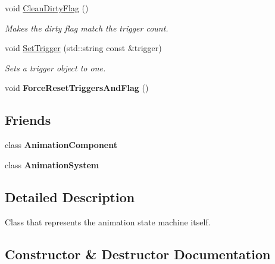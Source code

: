 \begin{DoxyCompactItemize}
\mbox{\label{classAnimatorController_a873290f0299ceeb9356cc87ff14d5a63}} 
void \hyperlink{classAnimatorController_a873290f0299ceeb9356cc87ff14d5a63}{Clean\+Dirty\+Flag} ()
\begin{DoxyCompactList}\small\item\em Makes the dirty flag match the trigger count. \end{DoxyCompactList}\item 
void \hyperlink{classAnimatorController_ac98dc31939a3e9b4377f01a0461b158d}{Set\+Trigger} (std\+::string const \&trigger)
\begin{DoxyCompactList}\small\item\em Sets a trigger object to one. \end{DoxyCompactList}\item 
\mbox{\label{classAnimatorController_a51a8be9bb0e31ea4d63742ff972a6512}} 
void {\bfseries Force\+Reset\+Triggers\+And\+Flag} ()
\end{DoxyCompactItemize}
\subsection*{Friends}
\begin{DoxyCompactItemize}
\item 
\mbox{\label{classAnimatorController_a47f9e2ec6ae5b27770bda1ead192dd55}} 
class {\bfseries Animation\+Component}
\item 
\mbox{\label{classAnimatorController_a4c8fb761c777f1a874c5d97e052686ad}} 
class {\bfseries Animation\+System}
\end{DoxyCompactItemize}


\subsection{Detailed Description}
Class that represents the animation state machine itself. 

\subsection{Constructor \& Destructor Documentation}
\mbox{\label{classAnimatorController_a9b32e8e7a4b72e80c6ae7a88fc961c4e}} 
